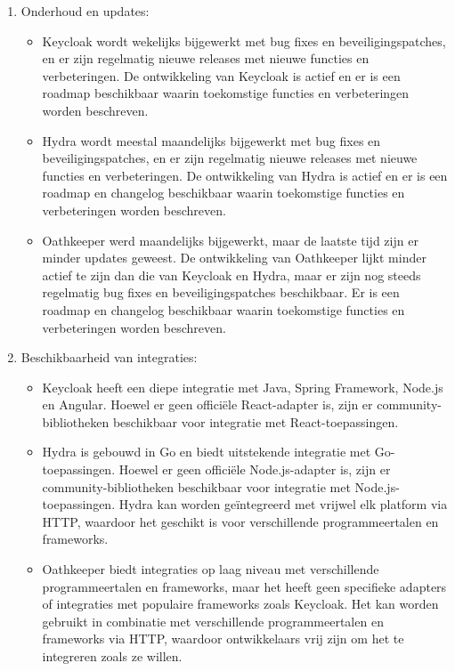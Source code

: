 \begin{enumerate}
  \item Onderhoud en updates:
  \begin{itemize}
    \item Keycloak wordt wekelijks bijgewerkt met bug fixes en beveiligingspatches, en er zijn regelmatig nieuwe releases met nieuwe functies en verbeteringen. De ontwikkeling van Keycloak is actief en er is een roadmap beschikbaar waarin toekomstige functies en verbeteringen worden beschreven.
    \item Hydra wordt meestal maandelijks bijgewerkt met bug fixes en beveiligingspatches, en er zijn regelmatig nieuwe releases met nieuwe functies en verbeteringen. De ontwikkeling van Hydra is actief en er is een roadmap en changelog beschikbaar waarin toekomstige functies en verbeteringen worden beschreven.
    \item Oathkeeper werd maandelijks bijgewerkt, maar de laatste tijd zijn er minder updates geweest. De ontwikkeling van Oathkeeper lijkt minder actief te zijn dan die van Keycloak en Hydra, maar er zijn nog steeds regelmatig bug fixes en beveiligingspatches beschikbaar. Er is een roadmap en changelog beschikbaar waarin toekomstige functies en verbeteringen worden beschreven.
  \end{itemize}
  
  \item Beschikbaarheid van integraties:
  \begin{itemize}
    \item Keycloak heeft een diepe integratie met Java, Spring Framework, Node.js en Angular. Hoewel er geen officiële React-adapter is, zijn er community-bibliotheken beschikbaar voor integratie met React-toepassingen.
    \item Hydra is gebouwd in Go en biedt uitstekende integratie met Go-toepassingen. Hoewel er geen officiële Node.js-adapter is, zijn er community-bibliotheken beschikbaar voor integratie met Node.js-toepassingen. Hydra kan worden geïntegreerd met vrijwel elk platform via HTTP, waardoor het geschikt is voor verschillende programmeertalen en frameworks.
    \item Oathkeeper biedt integraties op laag niveau met verschillende programmeertalen en frameworks, maar het heeft geen specifieke adapters of integraties met populaire frameworks zoals Keycloak. Het kan worden gebruikt in combinatie met verschillende programmeertalen en frameworks via HTTP, waardoor ontwikkelaars vrij zijn om het te integreren zoals ze willen.
  \end{itemize}
  

\end{enumerate}
